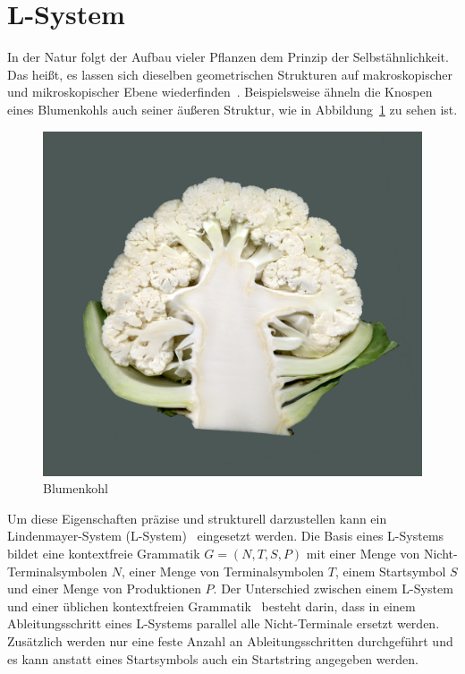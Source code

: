 \section{L-System}\label{sec:L-System}
In der Natur folgt der Aufbau vieler Pflanzen dem Prinzip der Selbstähnlichkeit.
Das heißt, es lassen sich dieselben geometrischen Strukturen auf makroskopischer und mikroskopischer Ebene wiederfinden~\cite{Shaker2016}.
Beispielsweise ähneln die Knospen eines Blumenkohls auch seiner äußeren Struktur, wie in Abbildung~\ref{fig:Blumenkohl} zu sehen ist.
\begin{figure}[ht]
    \centering
    \includegraphics[width=0.5\linewidth]{chapters/02_Grundlagen/L_System/Blumenkohl-1.jpg}
    \caption[Blumenkohl]{Blumenkohl\footnotemark}\label{fig:Blumenkohl}
\end{figure}

Um diese Eigenschaften präzise und strukturell darzustellen kann ein Lindenmayer-System (L-System)~\cite{lindenmayer1990} eingesetzt werden.
Die Basis eines L-Systems bildet eine kontextfreie Grammatik $G=(N,T,S,P)$ mit einer Menge von Nicht-Terminalsymbolen $N$, einer Menge von Terminalsymbolen $T$, einem Startsymbol $S$ und einer Menge von Produktionen $P$.
Der Unterschied zwischen einem L-System und einer üblichen kontextfreien Grammatik~\cite{Wegener2005} besteht darin, dass in einem Ableitungsschritt eines L-Systems parallel alle Nicht-Terminale ersetzt werden.
Zusätzlich werden nur eine feste Anzahl an Ableitungsschritten durchgeführt und es kann anstatt eines Startsymbols auch ein Startstring angegeben werden.

